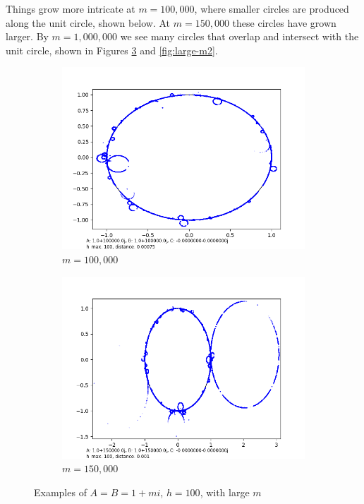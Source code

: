 \documentclass[12pt,a4paper,reqno,parskip=full]{amsart}
\numberwithin{equation}{section}
\theoremstyle{plain}
\theoremstyle{definition}
\begin{document}
Things grow more intricate at $m=100,000$, where smaller circles are produced along the unit circle, shown below. At $m=150,000$ these circles have grown larger. By $m=1,000,000$ we see many circles that overlap and intersect with the unit circle, shown in Figures \ref{fig:large-m} and \ref{fig:large-m2}.

\begin{figure}[H]
     \centering
     
     \begin{subfigure}[b]{0.49\textwidth}
         \centering
         \includegraphics[width=\textwidth]{images/m/a100,000,b100,000,h100,d.00075.png}
         \caption{$m=100,000$}
         \label{fig:m100,000}
     \end{subfigure}
     \begin{subfigure}[b]{0.49\textwidth}
         \centering
         \includegraphics[width=\textwidth]{images/m/a150,000,b150,000,h100,d.0010.png}
         \caption{$m=150,000$}
         \label{fig:m150,000}
     \end{subfigure}
        \caption{Examples of $A=B=1+mi$, $h=100$, with large $m$}
        \label{fig:large-m}
\end{figure}
\end{document}
